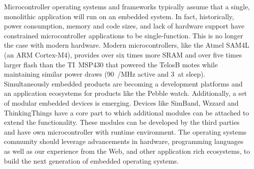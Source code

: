 Microcontroller operating systems and frameworks typically assume that a single,
monolithic application will run on an embedded system. In fact, historically,
power consumption, memory and code sizes, and lack of hardware support have
constrained microcontroller applications to be single-function. This is no
longer the case with modern hardware. Modern microcontrollers, like the Atmel
SAM4L (an ARM Cortex-M4), provides over six times more SRAM and over five times
larger flash than the TI~MSP430 that powered the TelosB motes while maintaining
similar power draws (90~{\uA}/MHz active and 3~\uA at sleep).
Simultaneously embedded products are becoming a development platforms and an
application ecosystems for products like the Pebble watch. Additionally, a set
of modular embedded devices is emerging. Devices like SimBand, Wzzard and
ThinkingThings have a core part to which additional modules can be attached to
extend the functionality. These modules can be developed by the third parties
and have own microcontroller with runtime environment.
The operating systems community should leverage advancements in hardware,
programming languages as well as our experience from the Web, and other
application rich ecosystems, to build the next generation of embedded operating
systems.


